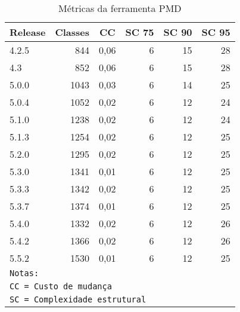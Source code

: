 \begin{table}[H]
\caption{Métricas da ferramenta PMD}
  \centering
\begin{tabular}{|l|r|r|r|r|r|}
\hline
\multicolumn{1}{|c|}{\textbf{Release}} & \multicolumn{1}{c|}{\textbf{Classes}} & \multicolumn{1}{c|}{\textbf{CC}} & \multicolumn{1}{c|}{\textbf{SC 75}} & \multicolumn{1}{c|}{\textbf{SC 90}} & \multicolumn{1}{c|}{\textbf{SC 95}} \\ \hline
4.2.5 & 844 & 0,06 & 6 & 15 & 28 \\ \hline
4.3 & 852 & 0,06 & 6 & 15 & 28 \\ \hline
5.0.0 & 1043 & 0,03 & 6 & 14 & 25 \\ \hline
5.0.4 & 1052 & 0,02 & 6 & 12 & 24 \\ \hline
5.1.0 & 1238 & 0,02 & 6 & 12 & 24 \\ \hline
5.1.3 & 1254 & 0,02 & 6 & 12 & 25 \\ \hline
5.2.0 & 1295 & 0,02 & 6 & 12 & 25 \\ \hline
5.3.0 & 1341 & 0,01 & 6 & 12 & 25 \\ \hline
5.3.3 & 1342 & 0,02 & 6 & 12 & 25 \\ \hline
5.3.7 & 1374 & 0,01 & 6 & 12 & 25 \\ \hline
5.4.0 & 1332 & 0,02 & 6 & 12 & 26 \\ \hline
5.4.2 & 1366 & 0,02 & 6 & 12 & 26 \\ \hline
5.5.2 & 1530 & 0,01 & 6 & 12 & 25 \\ \hline
\multicolumn{6}{l}{\texttt{Notas:}} \\
\multicolumn{6}{l}{\texttt{CC = Custo de mudança}} \\
\multicolumn{6}{l}{\texttt{SC = Complexidade estrutural}} \\ \hline
\end{tabular}
\label{metricas-pmd}
\end{table}

